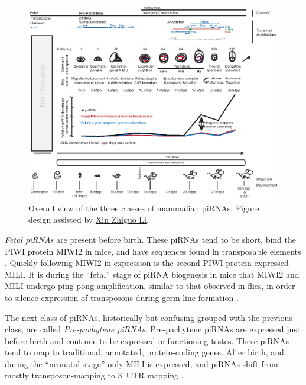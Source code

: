 {   \begin{figure} %
      \centering 
      \includegraphics{Figures/Intro/MammalianPiRNAClassesOverTime.eps}
      \caption[Different Classes of mammalian piRNAs]
      {
        Overall view of the three classes of mammalian piRNAs. Figure design assisted by \href{mailto:xin.li@umassmed.edu}{Xin Zhiguo Li}.
        } \label{Intro:fig:Mammalian piRNA classes}
      \end{figure}

    \textit{Fetal piRNAs} are present before birth. These piRNAs tend to be short, bind the PIWI protein MIWI2 in mice, and have sequences found in transposable elements \citep{Carmell2007}. Quickly following MIWI2 in expression is the second PIWI protein expressed MILI. It is during the ``fetal'' stage of piRNA biogenesis in mice that MIWI2 and MILI undergo ping-pong amplification, similar to that observed in flies, in order to silence expression of transposons during germ line formation  \citep{Kuramochi-Miyagawa2004, Aravin2006, Aravin2008a}.

    The next class of piRNAs, historically but confusing grouped with the previous class, are called \textit{Pre-pachytene piRNAs}. Pre-pachytene piRNAs are expressed just before birth and continue to be expressed in functioning testes. These piRNAs tend to map to traditional, annotated, protein-coding genes. After birth, and during the ``neonatal stage'' only MILI is expressed, and piRNAs shift from mostly transposon-mapping to 3\textprime~UTR mapping \citep{Robine2009}.

}
